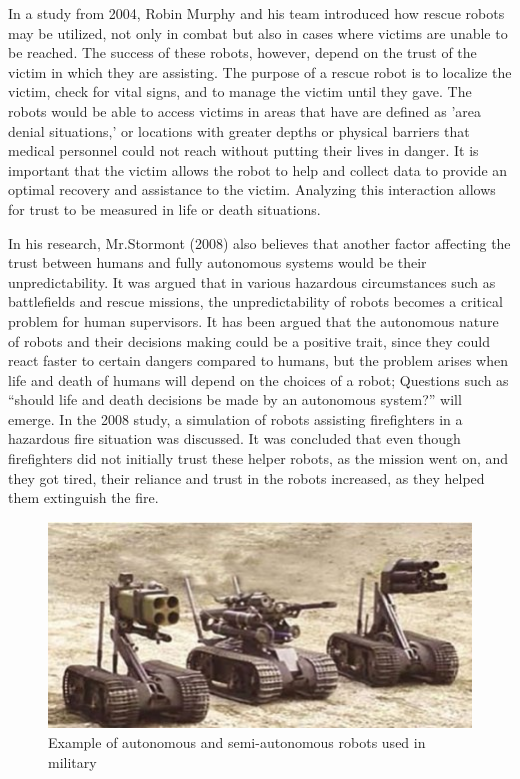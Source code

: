 \documentclass[runningheads,a4paper]{llncs}
\begin{document}
In a study from 2004, Robin Murphy and his team introduced how rescue robots may be utilized, not only in combat but also in cases where victims are unable to be reached\cite{murphy2004robot}.  The success of these robots, however, depend on the trust of the victim in which they are assisting.  The purpose of a rescue robot is to localize the victim, check for vital signs, and to manage the victim until they gave.  The robots would be able to access victims in areas that have are defined as 'area denial situations,' or locations with greater depths or physical barriers that medical personnel could not reach without putting their lives in danger.  It is important that the victim allows the robot to help and collect data to provide an optimal recovery and assistance to the victim.  Analyzing this interaction allows for trust to be measured in life or death situations.

In his research, Mr.Stormont (2008) also believes that another factor affecting the trust between humans and fully autonomous systems would be their unpredictability. It was argued that in various hazardous circumstances such as battlefields and rescue missions, the unpredictability of robots becomes a critical problem for human supervisors. It has been argued that the autonomous nature of robots and their decisions making could be a positive trait, since they could react faster to certain dangers compared to humans, but the problem arises when life and death of humans will depend on the choices of a robot; Questions such as ``should life and death decisions be made
by an autonomous system?'' will emerge. In the 2008 study, a simulation of robots assisting firefighters in a hazardous fire situation was discussed. It was concluded that even though firefighters did not initially trust these helper robots, as the mission went on, and they got tired, their reliance and trust in the robots increased, as they helped them extinguish the fire. 
\begin{figure} [h!]
    \centering
        \includegraphics[scale=0.6]{Figures/3robots.jpg}
    \caption{Example of autonomous and semi-autonomous robots used in military \cite{autonomousArmedRobots}}
    \label{MilitaryRobots}
\end{figure}
\end{document}

